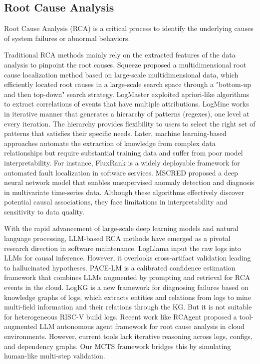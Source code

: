 \documentclass[10pt,conference]{IEEEtran}
\begin{document}
\subsection{Root Cause Analysis}
Root Cause Analysis (RCA) is a critical process to identify the underlying causes of system failures or abnormal behaviors\cite{zhong2024debug,xu2024unilog}. 

Traditional RCA methods mainly rely on the extracted features of the data analysis to pinpoint the root causes. Squeeze\cite{li2019generic} proposed a multidimensional root cause localization method based on large-scale multidimensional data, which efficiently located root causes in a large-scale search space through a "bottom-up and then top-down" search strategy. LogMaster\cite{fu2012logmaster} exploited apriori-like algorithms to extract correlations of events that have multiple attributions. LogMine\cite{hamooni2016logmine} works in iterative manner that generates a hierarchy of patterns (regexes), one level at every iteration. The hierarchy provides flexibility to users to select the right set of patterns that satisfies their specific needs. Later, machine learning-based approaches automate the extraction of knowledge from complex data relationships but require substantial training data and suffer from poor model interpretability. For instance, FluxRank\cite{liu2019fluxrank} is a widely deployable framework for automated fault localization in software services. MSCRED\cite{zhang2019deep} proposed a deep neural network model that enables unsupervised anomaly detection and diagnosis in multivariate time-series data. Although these algorithms effectively discover potential causal associations, they face limitations in interpretability and sensitivity to data quality.

With the rapid advancement of large-scale deep learning models and natural language processing, LLM-based RCA methods have emerged as a pivotal research direction in software maintenance. LogLlama\cite{yang2025logllama} input the raw logs into LLMs for causal inference. However, it overlooks cross-artifact validation leading to hallucinated hypotheses. PACE-LM\cite{zhang2023pace} is a calibrated confidence estimation framework that combines LLMs augmented by prompting and retrieval for RCA events in the cloud. LogKG\cite{sui2023logkg} is a new framework for diagnosing failures based on knowledge graphs of logs, which extracts entities and relations from logs to mine multi-field information and their relations through the KG. But it is not suitable for heterogeneous RISC-V build logs. Recent work like RCAgent\cite{wang2024rcagent} proposed a tool-augmented LLM autonomous agent framework for root cause analysis in cloud environments. However, current tools lack iterative reasoning across logs, configs, and dependency graphs. Our MCTS framework bridges this by simulating human-like multi-step validation.
\end{document}

